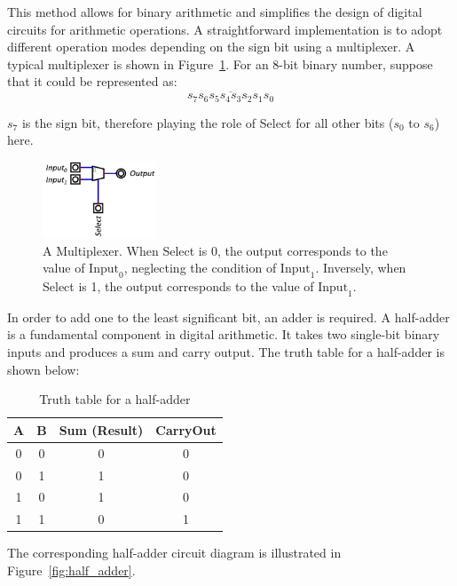 \documentclass[conference]{IEEEtran}
\begin{document}
This method allows for binary arithmetic and simplifies the design of digital circuits for arithmetic operations.
A straightforward implementation is to adopt different operation modes depending on the sign bit using a multiplexer. A typical multiplexer is shown in Figure~\ref{fig:multiplexer}. For an 8-bit binary number, suppose that it could be represented as:
\begin{equation}
    \overline{s_7 s_6 s_5 s_4 s_3 s_2 s_1 s_0}
\end{equation}

$s_7$ is the sign bit, therefore playing the role of Select for all other bits ($s_0$ to $s_6$) here.

\begin{figure}[h!]
    \centering
    \includegraphics[width=0.3\textwidth]{assets/multiplexer.png}
    \caption{A Multiplexer. When Select is 0, the output corresponds to the value of $\text{Input}_0$, neglecting the condition of $\text{Input}_1$. Inversely, when Select is 1, the output corresponds to the value of $\text{Input}_1$.}
    \label{fig:multiplexer}
\end{figure}

In order to add one to the least significant bit, an adder is required.
A half-adder is a fundamental component in digital arithmetic. It takes two single-bit binary inputs and produces a sum and carry output. The truth table for a half-adder is shown below:

\begin{table}[h!]
\centering
\begin{tabular}{|c|c|c|c|}
\hline
A & B & Sum (Result) & CarryOut \\ \hline
0 & 0 &  0  &   0   \\ \hline
0 & 1 &  1  &   0   \\ \hline
1 & 0 &  1  &   0   \\ \hline
1 & 1 &  0  &   1   \\ \hline
\end{tabular}
\caption{Truth table for a half-adder}
\end{table}

The corresponding half-adder circuit diagram is illustrated in Figure~\ref{fig:half_adder}.
\end{document}
